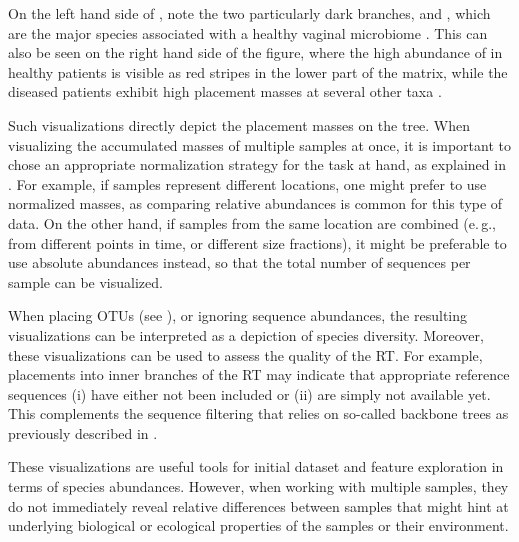 On the left hand side of , note the two particularly dark branches, 
 and ,
which are the major species associated with a healthy vaginal microbiome \cite{Srinivasan2012}.
This can also be seen on the right hand side of the figure,
where the high abundance of  in healthy patients
is visible as red stripes in the lower part of the matrix,
while the diseased patients exhibit high placement masses at several other taxa \cite{Srinivasan2012}.

Such visualizations directly depict the placement masses on the tree.
When visualizing the accumulated masses of multiple samples at once,
it is important to chose an appropriate normalization strategy for the task at hand,
as explained in .
For example, if samples represent different locations, one might prefer to use normalized masses,
as comparing relative abundances is common for this type of data.
On the other hand, if samples from the same location are combined
(e.\,g., from different points in time, or different size fractions),
it might be preferable to use absolute abundances instead,
so that the total number of sequences per sample can be visualized.

When placing OTUs (see ),
or ignoring sequence abundances, the resulting visualizations can be interpreted as a depiction of species diversity.
Moreover, these visualizations can be used to assess the quality of the \ac{RT}.
For example, placements into inner branches of the \ac{RT} may indicate that appropriate reference sequences
(i) have either not been included or (ii) are simply not available yet.
This complements the sequence filtering that relies on so-called backbone trees
as previously described in .

These visualizations are useful tools for initial dataset and feature exploration in terms of species abundances.
However, when working with multiple samples,
they do not immediately reveal relative differences between samples
that might hint at underlying biological or ecological properties of the samples or their environment.

